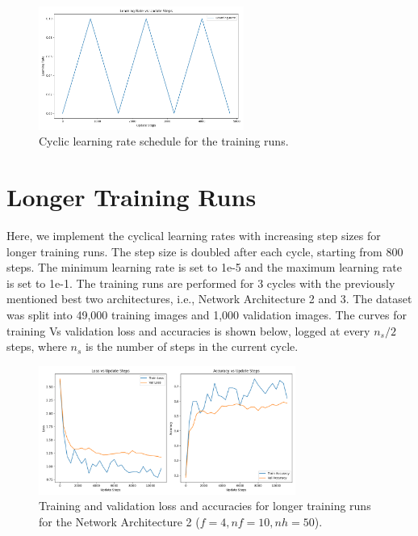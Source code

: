 \documentclass[11pt]{article}
\begin{document}
\begin{figure}[H]
    \centering
    \includegraphics[width=0.6\textwidth]{results/architecture_basic_2_learning_rate_plot.png}
    \caption{Cyclic learning rate schedule for the training runs.}
    \label{fig:cyclic_learning_rate}
\end{figure}

\section*{Longer Training Runs}

Here, we implement the cyclical learning rates with increasing step sizes for longer training runs. The step size is doubled after each cycle, starting from 800 steps. The minimum learning rate is set to 1e-5 and the maximum learning rate is set to 1e-1. The training runs are performed for 3 cycles with the previously mentioned best two architectures, i.e., Network Architecture 2 and 3. The dataset was split into 49,000 training images and 1,000 validation images.
The curves for training Vs validation loss and accuracies is shown below, logged at every $n_s/2$ steps, where $n_s$ is the number of steps in the current cycle.

\begin{figure}[H]
  \centering
  \includegraphics[width=0.75\textwidth]{results/architecture_2_training_plot.png}
  \caption{Training and validation loss and accuracies for longer training runs for the Network Architecture 2 ($f=4, nf=10, nh=50$).}
  \label{fig:longer_training_runs_arch2}
\end{figure}
\end{document}
